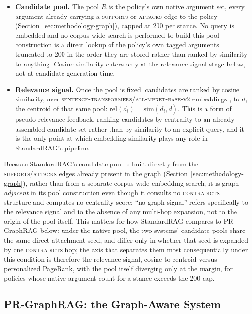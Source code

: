 \begin{itemize}
\item \textbf{Candidate pool.} The pool $R$ is the policy's own native argument set, every
argument already carrying a \textsc{supports} or \textsc{attacks} edge to the policy
(Section~\ref{sec:methodology-graph}), capped at 200 per stance. No query is embedded and no
corpus-wide search is performed to build this pool: construction is a direct lookup of the
policy's own tagged arguments, truncated to 200 in the order they are stored rather than ranked
by similarity to anything. Cosine similarity enters only at the relevance-signal stage below, not
at candidate-generation time.

\item \textbf{Relevance signal.} Once the pool is fixed, candidates are ranked by cosine
similarity, over \textsc{sentence-transformers/all-mpnet-base-v2} embeddings
\cite{reimers2019sbert,song2020mpnet}, to $\bar{d}$, the centroid of that same pool:
$\mathrm{rel}(d_i) = \mathrm{sim}(d_i, \bar{d})$. This is a form of pseudo-relevance feedback,
ranking candidates by centrality to an already-assembled candidate set rather than by similarity
to an explicit query, and it is the only point at which embedding similarity plays any role in
StandardRAG's pipeline.
\end{itemize}

Because StandardRAG's candidate pool is built directly from the \textsc{supports}/\textsc{attacks}
edges already present in the graph (Section~\ref{sec:methodology-graph}), rather than from a
separate corpus-wide embedding search, it is graph-\emph{adjacent} in its pool construction even
though it consults no \textsc{contradicts} structure and computes no centrality score; ``no graph
signal'' refers specifically to the relevance signal and to the absence of any multi-hop
expansion, not to the origin of the pool itself. This matters for how StandardRAG compares to
PR-GraphRAG below: under the native pool, the two systems' candidate pools share the same
direct-attachment seed, and differ only in whether that seed is expanded by one
\textsc{contradicts} hop; the axis that separates them most consequentially under this condition
is therefore the relevance signal, cosine-to-centroid versus personalized PageRank, with the pool
itself diverging only at the margin, for policies whose native argument count for a stance exceeds
the 200 cap.

\subsection{PR-GraphRAG: the Graph-Aware System}
\label{sec:methodology-prgraphrag}

